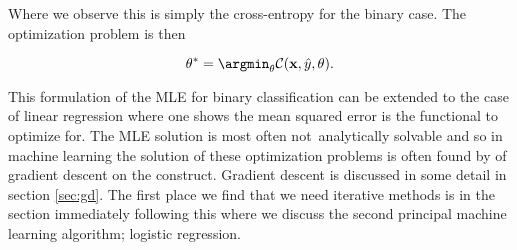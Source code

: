\noindent Where we observe this is simply the cross-entropy for the binary case. The optimization problem is then 

\begin{equation}
\theta^* = \argmin_\theta \mathcal{C}(\mathbf{x}, \hat{y}, \theta ).
\end{equation}

\noindent This formulation of the MLE for binary classification can be extended to the case of linear regression where one shows the mean squared error is the functional to optimize for. The MLE solution is most often not analytically solvable and so in machine learning the solution of these optimization problems is often found by of gradient descent on the construct. Gradient descent is discussed in some detail in section \ref{sec:gd}. The first place we find that we need iterative methods is in the section immediately following this where we discuss the second principal machine learning algorithm; logistic regression.

